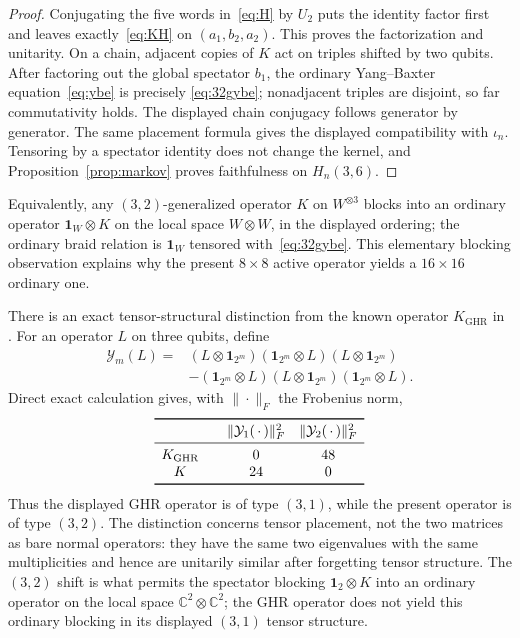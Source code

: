 \documentclass[11pt]{article}
\theoremstyle{remark}
\newcommand{\Id}{\mathbf 1}
\newcommand{\bbC}{\mathbb C}
\begin{document}
\begin{proof}
Conjugating the five words in~\eqref{eq:H} by \(U_2\) puts the identity
factor first and leaves exactly~\eqref{eq:KH} on
\((a_1,b_2,a_2)\).  This proves the factorization and unitarity.
On a chain, adjacent copies of \(K\) act on triples shifted by two qubits.
After factoring out the global spectator \(b_1\), the ordinary
Yang--Baxter equation~\eqref{eq:ybe} is precisely
\eqref{eq:32gybe}; nonadjacent triples are disjoint, so far commutativity
holds.  The displayed chain conjugacy follows generator by generator.
The same placement formula gives the displayed compatibility with
\(\iota_n\).
Tensoring by a spectator identity does not change the kernel, and
Proposition~\ref{prop:markov} proves faithfulness on \(H_n(3,6)\).
\end{proof}

Equivalently, any \((3,2)\)-generalized operator \(K\) on \(W^{\otimes3}\)
blocks into an ordinary operator \(\Id_W\otimes K\) on the local space
\(W\otimes W\), in the displayed ordering; the ordinary braid relation is
\(\Id_W\) tensored with~\eqref{eq:32gybe}.  This elementary blocking
observation explains why the present \(8\times8\) active operator yields a
\(16\times16\) ordinary one.

There is an exact tensor-structural distinction from the known operator
\(K_{\mathrm{GHR}}\) in
\cite[Eq.~(5.2), Theorem~5.28, and Remark~5.29(1)]{GHR2013}.  For an
operator \(L\) on three qubits, define
\[
\begin{aligned}
  \mathcal Y_m(L)={}&
  (L\otimes\Id_{2^m})(\Id_{2^m}\otimes L)(L\otimes\Id_{2^m})\\
  &-(\Id_{2^m}\otimes L)(L\otimes\Id_{2^m})(\Id_{2^m}\otimes L).
\end{aligned}
\]
Direct exact calculation gives, with \(\|\cdot\|_F\) the Frobenius norm,
\[
\begin{array}{c@{\qquad}cc}
\toprule
 & \|\mathcal Y_1(\,\cdot\,)\|_F^2
 & \|\mathcal Y_2(\,\cdot\,)\|_F^2\\
\midrule
K_{\mathrm{GHR}} & 0 & 48\\
K                  & 24 & 0\\
\bottomrule
\end{array}
\]
Thus the displayed GHR operator is of type \((3,1)\), while the present
operator is of type \((3,2)\).  The distinction concerns tensor placement,
not the two matrices as bare normal operators: they have the same two
eigenvalues with the same multiplicities and hence are unitarily similar
after forgetting tensor structure.  The \((3,2)\) shift is what permits the
spectator blocking \(\Id_2\otimes K\) into an ordinary operator on the local
space \(\bbC^2\otimes\bbC^2\); the GHR operator does not yield this ordinary
blocking in its displayed \((3,1)\) tensor structure.
\end{document}
